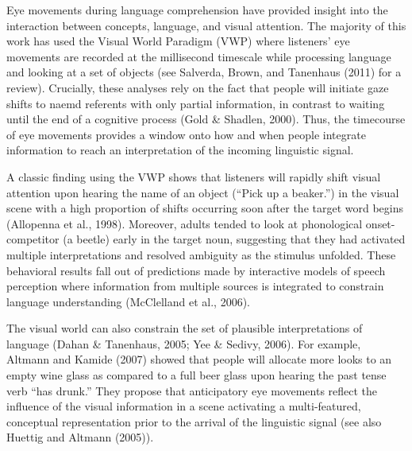 \documentclass[english,floatsintext,man]{apa6}
\begin{document}
Eye movements during language comprehension have provided insight into
the interaction between concepts, language, and visual attention. The
majority of this work has used the Visual World Paradigm (VWP) where
listeners' eye movements are recorded at the millisecond timescale while
processing language and looking at a set of objects (see Salverda,
Brown, and Tanenhaus (2011) for a review). Crucially, these analyses
rely on the fact that people will initiate gaze shifts to naemd
referents with only partial information, in contrast to waiting until
the end of a cognitive process (Gold \& Shadlen, 2000). Thus, the
timecourse of eye movements provides a window onto how and when people
integrate information to reach an interpretation of the incoming
linguistic signal.

A classic finding using the VWP shows that listeners will rapidly shift
visual attention upon hearing the name of an object (\enquote{Pick up a
beaker.}) in the visual scene with a high proportion of shifts occurring
soon after the target word begins (Allopenna et al., 1998). Moreover,
adults tended to look at phonological onset-competitor (a beetle) early
in the target noun, suggesting that they had activated multiple
interpretations and resolved ambiguity as the stimulus unfolded. These
behavioral results fall out of predictions made by interactive models of
speech perception where information from multiple sources is integrated
to constrain language understanding (McClelland et al., 2006).

The visual world can also constrain the set of plausible interpretations
of language (Dahan \& Tanenhaus, 2005; Yee \& Sedivy, 2006). For
example, Altmann and Kamide (2007) showed that people will allocate more
looks to an empty wine glass as compared to a full beer glass upon
hearing the past tense verb \enquote{has drunk.} They propose that
anticipatory eye movements reflect the influence of the visual
information in a scene activating a multi-featured, conceptual
representation prior to the arrival of the linguistic signal (see also
Huettig and Altmann (2005)).
\end{document}
